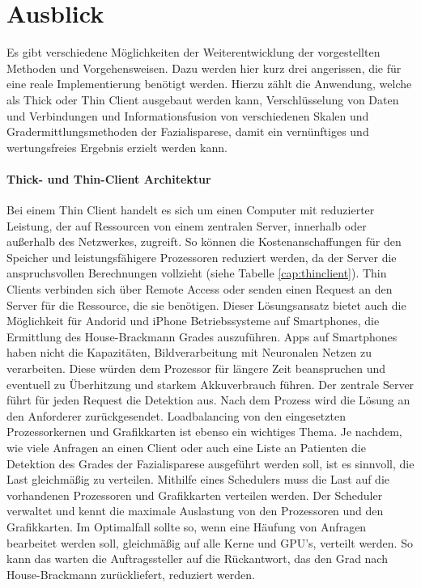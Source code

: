 \section{Ausblick}\label{next}
Es gibt verschiedene Möglichkeiten der Weiterentwicklung der vorgestellten Methoden und Vorgehensweisen. Dazu werden hier kurz drei angerissen, die für eine reale Implementierung benötigt werden. Hierzu zählt die Anwendung, welche als Thick oder Thin Client ausgebaut werden kann, Verschlüsselung von Daten und Verbindungen und Informationsfusion von verschiedenen Skalen und Gradermittlungsmethoden der Fazialisparese, damit ein vernünftiges und wertungsfreies Ergebnis erzielt werden kann.

\paragraph{Thick- und Thin-Client Architektur}\label{client}
Bei einem Thin Client handelt es sich um einen Computer mit reduzierter Leistung, der auf Ressourcen von einem zentralen Server, innerhalb oder außerhalb des Netzwerkes, zugreift. So können die Kostenanschaffungen für den Speicher und leistungsfähigere Prozessoren reduziert werden, da der Server die anspruchsvollen Berechnungen vollzieht (siehe Tabelle \ref{cap:thinclient}). Thin Clients verbinden sich über Remote Access oder senden einen Request an den Server für die Ressource, die sie benötigen. Dieser Lösungsansatz bietet auch die Möglichkeit für Andorid und iPhone Betriebssysteme auf Smartphones, die Ermittlung des House-Brackmann Grades auszuführen. Apps auf Smartphones haben nicht die Kapazitäten, Bildverarbeitung mit Neuronalen Netzen zu verarbeiten. Diese würden dem Prozessor für längere Zeit beanspruchen und eventuell zu Überhitzung und starkem Akkuverbrauch führen. Der zentrale Server führt für jeden Request die Detektion aus. Nach dem Prozess wird die Lösung an den Anforderer zurückgesendet. Loadbalancing von den eingesetzten Prozessorkernen und Grafikkarten ist ebenso ein wichtiges Thema. Je nachdem, wie viele Anfragen an einen Client oder auch eine Liste an Patienten die Detektion des Grades der Fazialisparese ausgeführt werden soll, ist es sinnvoll, die Last gleichmäßig zu verteilen. Mithilfe eines Schedulers muss die Last auf die vorhandenen Prozessoren und Grafikkarten verteilen werden. Der Scheduler verwaltet und kennt die maximale Auslastung von den Prozessoren und den Grafikkarten. Im Optimalfall sollte so, wenn eine Häufung von Anfragen bearbeitet werden soll, gleichmäßig auf alle Kerne und GPU’s, verteilt werden. So kann das warten die Auftragssteller auf die Rückantwort, das den Grad nach House-Brackmann zurückliefert, reduziert werden.

